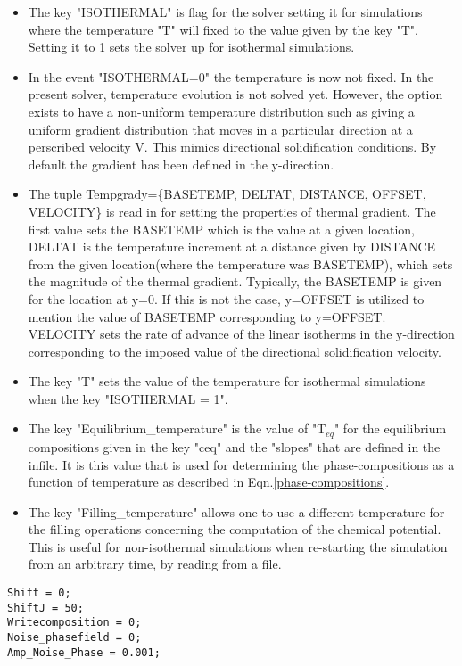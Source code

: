 \documentclass[a4paper,10pt]{article}
\begin{document}
\begin{itemize}
 \item The key "ISOTHERMAL" is flag for the solver setting it for simulations where the temperature "T" will fixed to the value given by the 
 key "T". Setting it to 1 sets the solver up for isothermal simulations.
 \item In the event "ISOTHERMAL=0" the temperature is now not fixed. In the present solver, temperature evolution is not solved yet. 
 However, the option exists to have a non-uniform temperature distribution such as giving a uniform gradient distribution that moves 
 in a particular direction at a perscribed velocity V. This mimics directional solidification conditions. By default the gradient 
 has been defined in the y-direction.
 \item The tuple Tempgrady=\{BASETEMP, DELTAT, DISTANCE, OFFSET, VELOCITY\} is read in for setting the properties of thermal gradient. 
 The first value sets the BASETEMP which is the value at a given location, DELTAT is the temperature increment at a distance given by DISTANCE from the given location(where the 
 temperature was BASETEMP), which sets the magnitude of the thermal gradient. Typically, the BASETEMP is given for the location at y=0. If this is not the 
 case, y=OFFSET is utilized to mention the value of BASETEMP corresponding to y=OFFSET. VELOCITY sets the rate of advance of the linear isotherms in the 
 y-direction corresponding to the imposed value of the directional solidification velocity.
 \item The key "T" sets the value of the temperature for isothermal simulations when the key "ISOTHERMAL = 1".
 \item The key "Equilibrium\_temperature" is the value of "T$_{eq}$" for the equilibrium compositions given in the key "ceq"
and the "slopes" that are defined in the infile. It is this value that is used for determining the phase-compositions as a function of temperature 
as described in Eqn.\ref{phase-compositions}.
\item The key "Filling\_temperature" allows one to use a different temperature for the filling operations concerning the computation of the chemical potential. 
This is useful for non-isothermal simulations when re-starting the simulation from an arbitrary time, by reading from a file. 
\end{itemize}

\begin{lstlisting}
Shift = 0;
ShiftJ = 50;
Writecomposition = 0;
Noise_phasefield = 0;
Amp_Noise_Phase = 0.001;
\end{lstlisting}
\end{document}
